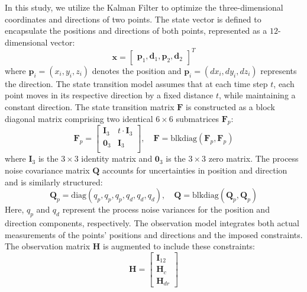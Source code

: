 In this study, we utilize the Kalman Filter to optimize the three-dimensional coordinates and directions of two points. The state vector is defined to encapsulate the positions and directions of both points, represented as a $12$-dimensional vector:
\begin{equation}
\mathbf{x} = \begin{bmatrix}
    \mathbf p_1,\mathbf d_1,\mathbf p_2,\mathbf d_2 
\end{bmatrix}^T
\end{equation}
where $\mathbf p_i=\left(x_i, y_i, z_i\right)$ denotes the position 
and $\mathbf p_i=\left(dx_i, dy_i, dz_i\right)$ represents the direction.
The state transition model assumes that at each time step $t$, each point moves in its respective direction by a fixed distance $t$, while maintaining a constant direction. The state transition matrix $\mathbf{F}$ is constructed as a block diagonal matrix comprising two identical $6 \times 6$ submatrices $\mathbf{F}_p$:
\begin{equation}
\mathbf{F}_p = \begin{bmatrix}
\mathbf{I}_3 & t \cdot \mathbf{I}_3 \\
\mathbf{0}_3 & \mathbf{I}_3 \\
\end{bmatrix}, \quad
\mathbf{F} = \text{blkdiag}(\mathbf{F}_p, \mathbf{F}_p)
\end{equation}
where $\mathbf{I}_3$ is the $3 \times 3$ identity matrix and $\mathbf{0}_3$ is the $3 \times 3$ zero matrix. The process noise covariance matrix $\mathbf{Q}$ accounts for uncertainties in position and direction and is similarly structured:
\begin{equation}
\mathbf{Q}_p = \text{diag}(q_p, q_p, q_p, q_d, q_d, q_d), \quad \mathbf{Q} = \text{blkdiag}(\mathbf{Q}_p, \mathbf{Q}_p)
\end{equation}
Here, $q_p$ and $q_d$ represent the process noise variances for the position and direction components, respectively.
The observation model integrates both actual measurements of the points' positions and directions and the imposed constraints. The observation matrix $\mathbf{H}$ is augmented to include these constraints:
\begin{equation}
\mathbf{H} = \begin{bmatrix}
\mathbf{I}_{12} \\
\mathbf{H}_c \\
\mathbf{H}_{dr}
\end{bmatrix}
\end{equation}
